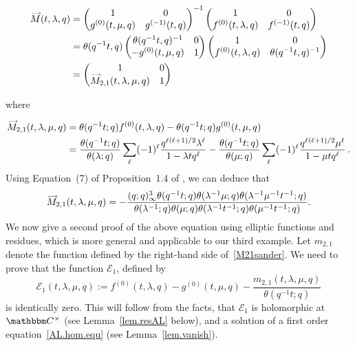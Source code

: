 \documentclass[12pt,reqno]{amsart}
\theoremstyle{definition}
\def\BC{\mathbbm C}
\def\calE{\mathcal E}
\def\be{\begin{equation}}
\def\ee{\end{equation}}
\def\vM{\accentset{\longrightarrow}{M}}
\begin{document}
\be
\begin{aligned}
\vM(t,\lambda,q)
&=
\begin{pmatrix}
  1 & 0\\
  g^{(0)}(t,\mu,q) & g^{(-1)}(t,q)
\end{pmatrix}^{-1}
\begin{pmatrix}
  1 & 0\\
  f^{(0)}(t,\lambda,q) & f^{(-1)}(t,q)
\end{pmatrix}\\
&=
\theta(q^{-1}t,q)
\begin{pmatrix}
  \theta(q^{-1}t,q)^{-1} & 0\\
  -g^{(0)}(t,\mu,q) & 1
\end{pmatrix}
\begin{pmatrix}
  1 & 0\\
  f^{(0)}(t,\lambda,q) & \theta(q^{-1}t,q)^{-1}
\end{pmatrix}\\
&=
\begin{pmatrix}
  1 & 0\\
  \vM_{2,1}(t,\lambda ,\mu ,q) & 1
\end{pmatrix}
\end{aligned}
\ee

where

\be
\begin{aligned}
\vM_{2,1}(t,\lambda ,\mu ,q)
&=
\theta(q^{-1}t;q)f^{(0)}(t,\lambda ,q)-\theta(q^{-1}t;q)g^{(0)}(t,\mu ,q)\\
&=
\frac{\theta(q^{-1}t;q)}{\theta(\lambda ;q)}\sum_{\ell}(-1)^{\ell}
\frac{q^{\ell(\ell+1)/2}\lambda ^{\ell}}{1-\lambda tq^{\ell}}
-\frac{\theta(q^{-1}t;q)}{\theta(\mu ;q)}\sum_{\ell}(-1)^{\ell}
\frac{q^{\ell(\ell+1)/2}\mu ^{\ell}}{1-\mu tq^{\ell}} \,.
\end{aligned}
\ee
Using Equation~(7) of Proposition~1.4 of \cite{Zwegersthesis}, we can deduce that
\be
\label{M21sander}
\vM_{2,1}(t,\lambda ,\mu ,q)
=
-\frac{(q;q)_{\infty}^{3}\theta(q^{-1}t;q)\theta(\lambda ^{-1}\mu ;q)
  \theta(\lambda ^{-1}\mu ^{-1}t^{-1};q)}{\theta(\lambda ^{-1};q)\theta(\mu ;q)
  \theta(\lambda ^{-1}t^{-1};q)\theta(\mu ^{-1}t^{-1};q)}.
\ee
We now give a second proof of the above equation using elliptic functions and
residues, which is more general and applicable to our third example. Let $m_{2,1}$
denote the function defined by the right-hand side of~\eqref{M21sander}.
We need to prove that the function $\calE_1$, defined by
\be
\calE_1(t,\lambda,\mu,q)
:=
f^{(0)}(t,\lambda,q)
-g^{(0)}(t,\mu,q)
-\frac{m_{2,1}(t,\lambda,\mu,q)}{\theta(q^{-1}t;q)}
\ee
is identically zero. This will follow from the facts, that
$\calE_1$ is holomorphic at $\BC^\times$ (see Lemma~\ref{lem.resAL} below),
and a solution of a first order equation~\eqref{AL.hom.equ}
(see Lemma~\ref{lem.vanish}). 
\end{document}
